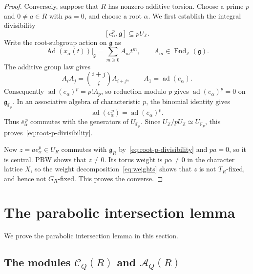\documentclass[twoside,a4paper,12pt,reqno]{amsart}
\theoremstyle{remark}
\numberwithin{equation}{section}
\newcommand{\Z}{\mathbb Z}
\newcommand{\F}{\mathbb F}
\newcommand{\fg}{\mathfrak g}
\newcommand{\cA}{\mathcal A}
\DeclareMathOperator{\Ad}{Ad}
\begin{document}
\begin{proof}
Conversely, suppose that \(R\) has nonzero additive torsion. Choose a prime \(p\) and \(0\ne a\in R\) with \(pa=0\), and choose a root \(\alpha\). We first establish the integral divisibility
\begin{equation}\label{eq:root-p-divisibility}
[e_\alpha^p,\fg]\subseteq pU_{\Z}.
\end{equation}
Write the root-subgroup action on \(\fg\) as
\[
\Ad(x_\alpha(t))\big|_{\fg}
=\sum_{m\ge0}A_mt^m,\qquad
A_m\in\operatorname{End}_{\Z}(\fg).
\]
The additive group law gives
\[
A_iA_j=\binom{i+j}{i}A_{i+j},\qquad
A_1=\operatorname{ad}(e_\alpha).
\]
Consequently \(\operatorname{ad}(e_\alpha)^p=p!A_p\), so reduction modulo \(p\) gives
\(\operatorname{ad}(\overline e_\alpha)^p=0\) on \(\fg_{\F_p}\). In an associative algebra of characteristic \(p\), the binomial identity gives
\[
\operatorname{ad}(\overline e_\alpha^{\,p})
=\operatorname{ad}(\overline e_\alpha)^p.
\]
Thus \(\overline e_\alpha^{\,p}\) commutes with the generators of \(U_{\F_p}\). Since \(U_{\Z}/pU_{\Z}\simeq U_{\F_p}\), this proves~\eqref{eq:root-p-divisibility}.

Now \(z=a e_\alpha^p\in U_R\) commutes with \(\fg_R\) by~\eqref{eq:root-p-divisibility} and \(pa=0\), so it is central. PBW shows that \(z\ne0\). Its torus weight is \(p\alpha\ne0\) in the character lattice \(X\), so the weight decomposition~\eqref{eq:weights} shows that \(z\) is not \(T_R\)-fixed, and hence not \(G_R\)-fixed. This proves the converse.
\end{proof}

\section{The parabolic intersection lemma}\label{sec:reconstruction}

We prove the parabolic intersection lemma in this section.

\subsection{The modules \texorpdfstring{\(\mathcal C_Q(R)\) and \(\cA_Q(R)\)}{C\_Q(R) and A\_Q(R)}}\label{subsec:classical-comparisons}
\end{document}
